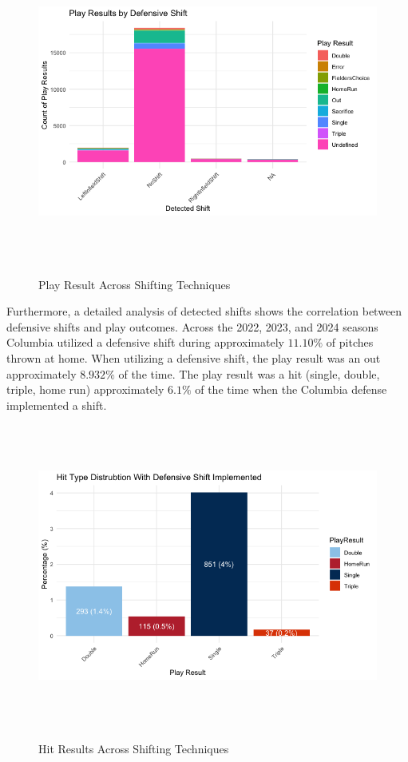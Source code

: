 \documentclass{article}
\begin{document}
\newpage

\begin{figure}[h]
    \centering
    \includegraphics[height=10cm]{images/shift_breakdown.png}
    \caption{Play Result Across Shifting Techniques}
    \cite{trackman2022} \cite{trackman2023} \cite{trackman2024} \cite{albert2023analyzing}
\end{figure}
\vspace{1cm}

Furthermore, a detailed analysis of detected shifts shows the correlation between defensive shifts and play outcomes. Across the 2022, 2023, and 2024 seasons Columbia utilized a defensive shift during approximately $11.10\%$ of pitches thrown at home. When utilizing a defensive shift, the play result was an out approximately $8.932\%$ of the time. The play result was a hit (single, double, triple, home run) approximately $6.1\%$ of the time when the Columbia defense implemented a shift. 

\newpage
\begin{figure}[h]
    \centering
    \includegraphics[height=10cm]{images/hits_against_shift.png}
    \caption{Hit Results Across Shifting Techniques}
    \cite{trackman2022} \cite{trackman2023} \cite{trackman2024} \cite{albert2023analyzing}
\end{figure}
\end{document}
